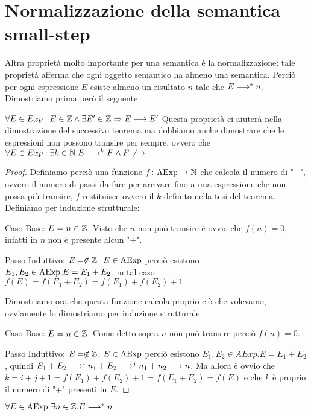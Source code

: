 \section{Normalizzazione della semantica small-step} 
Altra proprietà molto importante per una semantica è la normalizzazione: tale proprietà afferma che
ogni oggetto semantico ha almeno una semantica. Perciò per ogni espressione $E$
esiste almeno un risultato $n$ tale che $E \longrightarrow ^* n$.
Dimostriamo prima però il seguente

\begin{teorema}
$\forall E \in Exp \mathrel{:} E \in \mathbb{Z} \land \exists E' \in \mathbb{Z} \Rightarrow E \longrightarrow E'$
Questa proprietà ci aiuterà nella dimostrazione del successivo teorema ma dobbiamo anche dimostrare che le espressioni non possono transire per sempre, ovvero che $\forall E \in Exp \mathrel{:} \exists k \in \mathbb{N} . E \longrightarrow ^k F \land F \not \longrightarrow$
\end{teorema}

\begin{proof}
Definiamo perciò una funzione $\mathord{f}\colon\mathrm{AExp}\to\mathbb{N}$ che calcola il numero di "+", ovvero il numero di passi da fare per arrivare fino a una espressione che non possa più transire, $f$ restituisce ovvero il $k$ definito nella tesi del teorema. Definiamo per induzione strutturale:

Caso Base: $E = n \in \mathbb{Z}$.
Visto che $n$ non può transire è ovvio che $f(n) = 0$, infatti in $n$ non è presente alcun "+".

Passo Induttivo: $E = \not \in \mathbb{Z}$.
$E \in \mathrm{AExp}$ perciò esistono $E_1, E_2 \in \mathrm{AExp} . E = E_1 + E_2$, in tal caso $f(E) = f(E_1 + E_2) = f(E_1) + f(E_2) + 1$

Dimostriamo ora che questa funzione calcola proprio ciò che volevamo, ovviamente lo dimostriamo per induzione strutturale:

Caso Base: $E = n \in \mathbb{Z}$.
Come detto sopra $n$ non può transire perciò $f(n) = 0$.

Passo Induttivo: $E = \not \in \mathbb{Z}$.
$E \in \mathrm{AExp}$ perciò esistono $E_1, E_2 \in AExp . E = E_1 + E_2$, quindi $E_1 + E_2 \longrightarrow ^i n_1 + E_2 \longrightarrow ^j n_1 + n_2 \longrightarrow n$. Ma allora è ovvio che $k = i + j + 1 = f(E_1) + f(E_2) + 1 = f(E_1 + E_2) = f(E)$ e che $k$ è proprio il numero di "+" presenti in $E$.
\end{proof}

\begin{teorema}[Normalizzazione]
  $\forall E \in \mathrm{AExp}\ \exists n \in \mathbb{Z} . E \longrightarrow ^* n$
\end{teorema}

